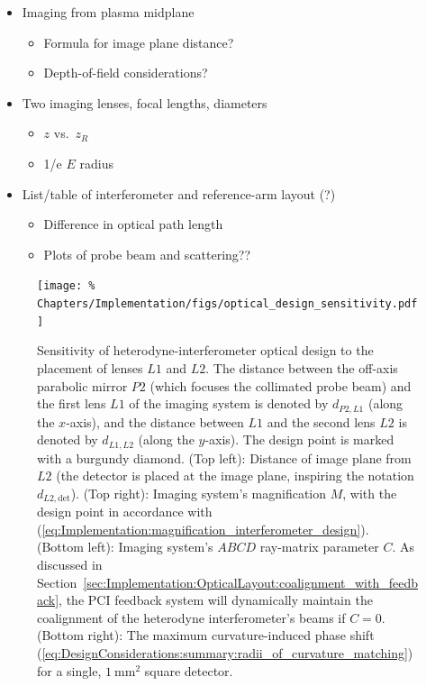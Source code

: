 \begin{itemize}
  \item Imaging from plasma midplane
    \begin{itemize}
      \item Formula for image plane distance?
      \item Depth-of-field considerations?
    \end{itemize}
  \item Two imaging lenses, focal lengths, diameters
    \begin{itemize}
      \item $z$ vs.\ $z_R$
      \item 1/e $E$ radius
    \end{itemize}
  \item List/table of interferometer and reference-arm layout (?)
    \begin{itemize}
      \item Difference in optical path length
      \item Plots of probe beam and scattering??
    \end{itemize}
\end{itemize}

\begin{figure}
  \centering
  \texttt{[image: \%
    Chapters/Implementation/figs/optical\_design\_sensitivity.pdf]}
  \caption[Sensitivity of heterodyne-interferometer optical design]{%
    Sensitivity of heterodyne-interferometer optical design
    to the placement of lenses $L1$ and $L2$.
    The distance between the off-axis parabolic mirror $P2$
    (which focuses the collimated probe beam) and
    the first lens $L1$ of the imaging system
    is denoted by $d_{P2,L1}$ (along the $x$-axis), and
    the distance between $L1$ and the second lens $L2$
    is denoted by $d_{L1,L2}$ (along the $y$-axis).
    The design point is marked with a burgundy diamond.
    (Top left): Distance of image plane from $L2$
    (the detector is placed at the image plane,
    inspiring the notation $d_{L2,\text{det}}$).
    (Top right): Imaging system's magnification $M$,
    with the design point in accordance with
    (\ref{eq:Implementation:magnification_interferometer_design}).
    (Bottom left): Imaging system's $ABCD$ ray-matrix parameter $C$.
    As discussed in Section~\ref{sec:Implementation:OpticalLayout:coalignment_with_feedback},
    the PCI feedback system will dynamically maintain
    the coalignment of the heterodyne interferometer's beams if $C = 0$.
    (Bottom right): The maximum curvature-induced phase shift
    (\ref{eq:DesignConsiderations:summary:radii_of_curvature_matching})
    for a single, $\SI{1}{\milli\meter\squared}$ square detector.
  }
\label{fig:Implementation:optical_design_sensitivity}
\end{figure}


